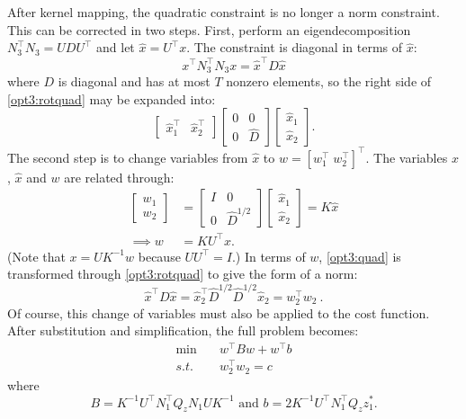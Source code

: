 \documentclass[conference]{IEEEtran}
\begin{document}
After kernel mapping, the quadratic constraint is no longer a norm
constraint. This can be corrected in two steps. First, perform an
eigendecomposition $N_3^\top N_3 = UDU^\top$ and let $\hat{x} = U^\top
x$. The constraint is diagonal in terms of $\hat{x}$:
\begin{equation}
\label{opt3:rotquad} x^\top N_3^\top N_3 x = \hat{x}^\top D\hat{x}
\end{equation}
where $D$ is diagonal and has at most $T$ nonzero elements, so the
right side of \eqref{opt3:rotquad} may be expanded into:
\begin{equation}
\begin{bmatrix}
\hat{x}_1^\top & \hat{x}_2^\top \end{bmatrix}
\begin{bmatrix} 0 & 0 \\ 0 & \hat{D} \end{bmatrix}
\begin{bmatrix}
\hat{x}_1 \\ \hat{x}_2
\end{bmatrix}.
\end{equation}
The second step is to change variables from $\hat{x}$ to $w =
[w_1^\top \; w_2^\top]^\top$. The variables $x$, $\hat{x}$ and $w$ are
related through:
\begin{align}
\label{eq:x_to_w} \begin{bmatrix} w_1 \\ w_2 \end{bmatrix} &=
\begin{bmatrix} I & 0 \\ 0 & \hat{D}^{1/2} \end{bmatrix}
\begin{bmatrix} \hat{x}_1 \\ \hat{x}_2 \end{bmatrix} = K\hat{x} \\
\nonumber \implies w &= KU^\top x.
\end{align}
(Note that $x = UK^{-1}w$ because $UU^\top = I$.) In terms of $w$,
\eqref{opt3:quad} is transformed through \eqref{opt3:rotquad} to give
the form of a norm:
\begin{equation}
\hat{x}^\top D\hat{x} = \hat{x}_2^\top \hat{D}^{1/2}\hat{D}^{1/2}\hat{x}_2
= w_2^\top w_2~.
\end{equation}
Of course, this change of variables must also be applied to the cost function. After substitution and simplification, the full problem becomes:
\begin{subequations}\label{opt4}
\begin{align}
\label{opt4:obj} \min\quad &w^\top Bw + w^\top b \\
\label{opt4:quad} s.t.\quad &w_2^\top w_2 = c
\end{align}
\end{subequations}
where
\[
B= K^{-1}U^\top N_1^\top Q_z N_1 UK^{-1} \text{ and }b=2 K^{-1}U^\top
N_1^\top Q_z z_1^*.
\]
\end{document}
